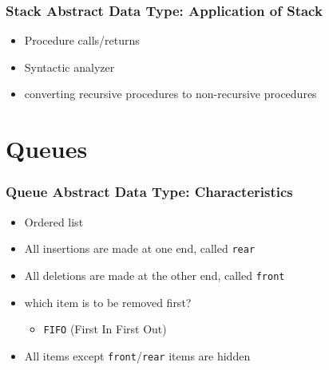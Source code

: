 \documentclass[newPxFont,sthlmFooter,nooffset]{beamer}
\begin{document}
\begin{frame}[t]
  \frametitle{Stack Abstract Data Type: Application of Stack}
  \begin{itemize}
  \item Procedure calls/returns
  \item Syntactic analyzer
  \item converting recursive procedures to non-recursive procedures
  \end{itemize}
\end{frame}




\section{Queues} 
\begin{frame}[t]
  \frametitle{Queue Abstract Data Type: Characteristics}
  \begin{itemize}
  \item Ordered list
  \item All insertions are made at one end, called \texttt{rear}
  \item All deletions are made at the other end, called \texttt{front}
  \item which item is to be removed first?
    \begin{itemize}
    \item \texttt{FIFO} (First In First Out)
    \end{itemize}
  \item All items except \texttt{front}/\texttt{rear} items are hidden
  \end{itemize}
\end{frame}
\end{document}
